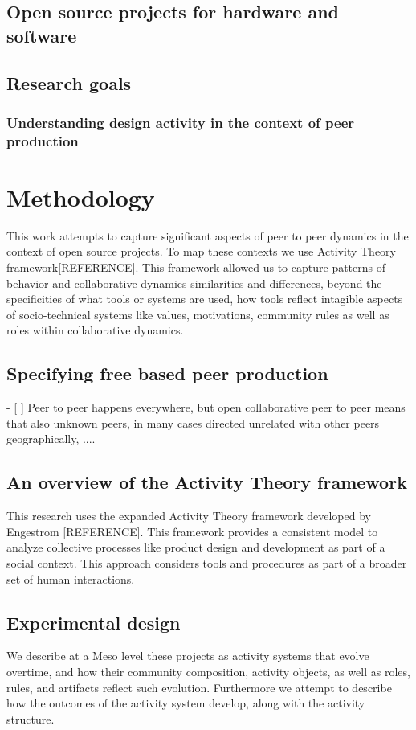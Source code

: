 \documentclass{ICED-Paper}%
\begin{document}
\cite{Mozilla_arch}


\subsection{Open source projects for hardware and software}

\subsection{Research goals}

\subsubsection{Understanding design activity in the context of peer production}

\section{Methodology}
This work attempts to capture significant aspects of peer to peer dynamics in the context of open source projects. To map these contexts we use Activity Theory framework[REFERENCE]. This framework allowed us to capture patterns of behavior and collaborative dynamics similarities and differences, beyond the specificities of what tools or systems are used, how tools reflect intagible aspects of socio-technical systems like values, motivations, community rules as well as roles within collaborative dynamics.
\subsection{Specifying free based peer production}
- [ ] Peer to peer happens everywhere, but open collaborative peer to peer means that also unknown peers, in many cases directed unrelated with other peers geographically, ....
\subsection{An overview of  the Activity Theory framework}
This research uses the expanded Activity Theory framework developed by Engestrom [REFERENCE]. This framework provides a consistent model to analyze collective processes like product design and development as part of a social context. This approach considers tools and procedures as part of a broader set of human interactions.
\subsection{Experimental design}

We describe at a Meso level these projects as activity  systems that evolve overtime, and how their community composition, activity objects, as well as roles, rules, and artifacts reflect such evolution. Furthermore we attempt to describe how the outcomes of the activity system develop, along with the activity structure.
\end{document}
